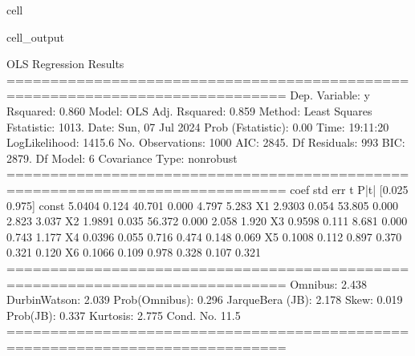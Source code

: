 \documentclass[letterpaper,10pt,english]{jupyterBook}
\begin{document}
\begin{sphinxuseclass}{cell}
\begin{sphinxVerbatimOutput}
\begin{sphinxuseclass}{cell_output}
\begin{sphinxVerbatim}[commandchars=\\\{\}]
                            OLS Regression Results                            
==============================================================================
Dep. Variable:                      y   R\PYGZhy{}squared:                       0.860
Model:                            OLS   Adj. R\PYGZhy{}squared:                  0.859
Method:                 Least Squares   F\PYGZhy{}statistic:                     1013.
Date:                Sun, 07 Jul 2024   Prob (F\PYGZhy{}statistic):               0.00
Time:                        19:11:20   Log\PYGZhy{}Likelihood:                \PYGZhy{}1415.6
No. Observations:                1000   AIC:                             2845.
Df Residuals:                     993   BIC:                             2879.
Df Model:                           6                                         
Covariance Type:            nonrobust                                         
==============================================================================
                 coef    std err          t      P\PYGZgt{}|t|      [0.025      0.975]
\PYGZhy{}\PYGZhy{}\PYGZhy{}\PYGZhy{}\PYGZhy{}\PYGZhy{}\PYGZhy{}\PYGZhy{}\PYGZhy{}\PYGZhy{}\PYGZhy{}\PYGZhy{}\PYGZhy{}\PYGZhy{}\PYGZhy{}\PYGZhy{}\PYGZhy{}\PYGZhy{}\PYGZhy{}\PYGZhy{}\PYGZhy{}\PYGZhy{}\PYGZhy{}\PYGZhy{}\PYGZhy{}\PYGZhy{}\PYGZhy{}\PYGZhy{}\PYGZhy{}\PYGZhy{}\PYGZhy{}\PYGZhy{}\PYGZhy{}\PYGZhy{}\PYGZhy{}\PYGZhy{}\PYGZhy{}\PYGZhy{}\PYGZhy{}\PYGZhy{}\PYGZhy{}\PYGZhy{}\PYGZhy{}\PYGZhy{}\PYGZhy{}\PYGZhy{}\PYGZhy{}\PYGZhy{}\PYGZhy{}\PYGZhy{}\PYGZhy{}\PYGZhy{}\PYGZhy{}\PYGZhy{}\PYGZhy{}\PYGZhy{}\PYGZhy{}\PYGZhy{}\PYGZhy{}\PYGZhy{}\PYGZhy{}\PYGZhy{}\PYGZhy{}\PYGZhy{}\PYGZhy{}\PYGZhy{}\PYGZhy{}\PYGZhy{}\PYGZhy{}\PYGZhy{}\PYGZhy{}\PYGZhy{}\PYGZhy{}\PYGZhy{}\PYGZhy{}\PYGZhy{}\PYGZhy{}\PYGZhy{}
const          5.0404      0.124     40.701      0.000       4.797       5.283
X1             2.9303      0.054     53.805      0.000       2.823       3.037
X2            \PYGZhy{}1.9891      0.035    \PYGZhy{}56.372      0.000      \PYGZhy{}2.058      \PYGZhy{}1.920
X3             0.9598      0.111      8.681      0.000       0.743       1.177
X4            \PYGZhy{}0.0396      0.055     \PYGZhy{}0.716      0.474      \PYGZhy{}0.148       0.069
X5            \PYGZhy{}0.1008      0.112     \PYGZhy{}0.897      0.370      \PYGZhy{}0.321       0.120
X6             0.1066      0.109      0.978      0.328      \PYGZhy{}0.107       0.321
==============================================================================
Omnibus:                        2.438   Durbin\PYGZhy{}Watson:                   2.039
Prob(Omnibus):                  0.296   Jarque\PYGZhy{}Bera (JB):                2.178
Skew:                           0.019   Prob(JB):                        0.337
Kurtosis:                       2.775   Cond. No.                         11.5
==============================================================================


\end{sphinxVerbatim}
\end{sphinxuseclass}
\end{sphinxVerbatimOutput}
\end{sphinxuseclass}
\end{document}
